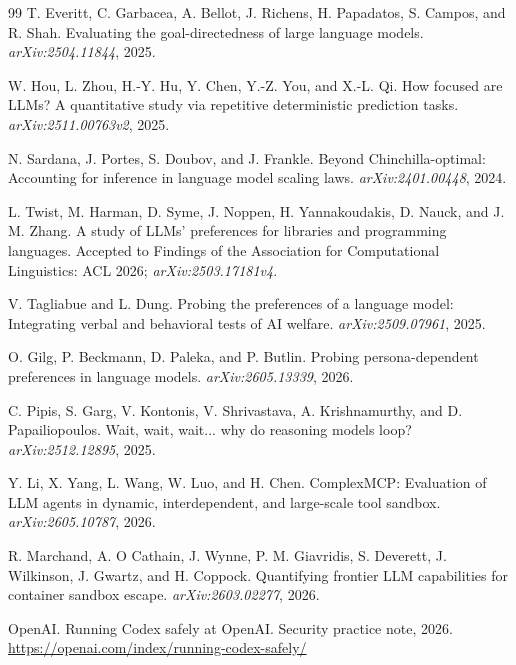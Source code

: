 \documentclass[11pt,a4paper]{article}
\begin{document}
\begin{thebibliography}{99}
T. Everitt, C. Garbacea, A. Bellot, J. Richens, H. Papadatos, S. Campos, and R. Shah.
\newblock Evaluating the goal-directedness of large language models.
\newblock \emph{arXiv:2504.11844}, 2025.

W. Hou, L. Zhou, H.-Y. Hu, Y. Chen, Y.-Z. You, and X.-L. Qi.
\newblock How focused are LLMs? A quantitative study via repetitive deterministic prediction tasks.
\newblock \emph{arXiv:2511.00763v2}, 2025.

N. Sardana, J. Portes, S. Doubov, and J. Frankle.
\newblock Beyond Chinchilla-optimal: Accounting for inference in language model scaling laws.
\newblock \emph{arXiv:2401.00448}, 2024.

L. Twist, M. Harman, D. Syme, J. Noppen, H. Yannakoudakis, D. Nauck, and J. M. Zhang.
\newblock A study of LLMs' preferences for libraries and programming languages.
\newblock Accepted to Findings of the Association for Computational Linguistics: ACL 2026; \emph{arXiv:2503.17181v4}.

V. Tagliabue and L. Dung.
\newblock Probing the preferences of a language model: Integrating verbal and behavioral tests of AI welfare.
\newblock \emph{arXiv:2509.07961}, 2025.

O. Gilg, P. Beckmann, D. Paleka, and P. Butlin.
\newblock Probing persona-dependent preferences in language models.
\newblock \emph{arXiv:2605.13339}, 2026.

C. Pipis, S. Garg, V. Kontonis, V. Shrivastava, A. Krishnamurthy, and D. Papailiopoulos.
\newblock Wait, wait, wait... why do reasoning models loop?
\newblock \emph{arXiv:2512.12895}, 2025.

Y. Li, X. Yang, L. Wang, W. Luo, and H. Chen.
\newblock ComplexMCP: Evaluation of LLM agents in dynamic, interdependent, and large-scale tool sandbox.
\newblock \emph{arXiv:2605.10787}, 2026.

R. Marchand, A. O Cathain, J. Wynne, P. M. Giavridis, S. Deverett, J. Wilkinson, J. Gwartz, and H. Coppock.
\newblock Quantifying frontier LLM capabilities for container sandbox escape.
\newblock \emph{arXiv:2603.02277}, 2026.

OpenAI.
\newblock Running Codex safely at OpenAI.
\newblock Security practice note, 2026. \url{https://openai.com/index/running-codex-safely/}


\end{thebibliography}
\end{document}
